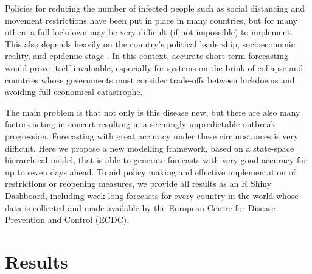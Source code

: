 \documentclass[fleqn,10pt]{wlscirep}
\begin{document}
Policies for reducing the number of infected people such as social distancing and movement restrictions have been put in place in many countries, but for many others a full lockdown may be very difficult (if not impossible) to implement. This also depends heavily on the country's political leadership, socioeconomic reality, and epidemic stage \cite{Kassem2020, Mehtar2020}. In this context, accurate short-term forecasting would prove itself invaluable, especially for systems on the brink of collapse and countries whose governments must consider trade-offs between lockdowns and avoiding full economical catastrophe.

The main problem is that not only is this disease new, but there are also many factors acting in concert resulting in a seemingly unpredictable outbreak progression. Forecasting with great accuracy under these circumstances is very difficult. Here we propose a new modelling framework, based on a state-space hierarchical model, that is able to generate forecasts with very good accuracy for up to seven days ahead. To aid policy making and effective implementation of restrictions or reopening measures, we provide all results as an R Shiny Dashboard, including week-long forecasts for every country in the world whose data is collected and made available by the European Centre for Disease Prevention and Control (ECDC).

\section*{Results}
\end{document}
